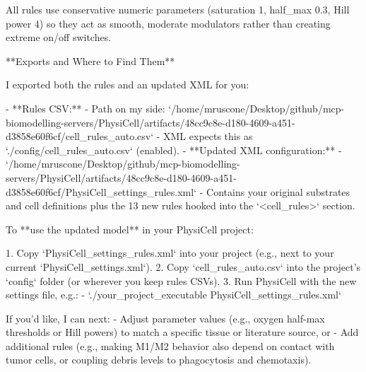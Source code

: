 \documentclass[11pt,a4paper]{article}
\begin{document}
\begin{copilotbox}
All rules use conservative numeric parameters (saturation 1, half\_max 0.3, Hill power 4) so they act as smooth, moderate modulators rather than creating extreme on/off switches.

**Exports and Where to Find Them**

I exported both the rules and an updated XML for you:

- **Rules CSV:**  
  - Path on my side:  
    `/home/mruscone/Desktop/github/mcp-biomodelling-servers/PhysiCell/artifacts/48cc9c8e-d180-4609-a451-d3858e60f6cf/cell\_rules\_auto.csv`  
  - XML expects this as `./config/cell\_rules\_auto.csv` (enabled).
- **Updated XML configuration:**  
  - `/home/mruscone/Desktop/github/mcp-biomodelling-servers/PhysiCell/artifacts/48cc9c8e-d180-4609-a451-d3858e60f6cf/PhysiCell\_settings\_rules.xml`  
  - Contains your original substrates and cell definitions plus the 13 new rules hooked into the `<cell\_rules>` section.

To **use the updated model** in your PhysiCell project:

1. Copy `PhysiCell\_settings\_rules.xml` into your project (e.g., next to your current `PhysiCell\_settings.xml`).
2. Copy `cell\_rules\_auto.csv` into the project’s `config` folder (or wherever you keep rules CSVs).
3. Run PhysiCell with the new settings file, e.g.:
   - `./your\_project\_executable PhysiCell\_settings\_rules.xml`

If you’d like, I can next:
- Adjust parameter values (e.g., oxygen half-max thresholds or Hill powers) to match a specific tissue or literature source, or
- Add additional rules (e.g., making M1/M2 behavior also depend on contact with tumor cells, or coupling debris levels to phagocytosis and chemotaxis).

\end{copilotbox}
\end{document}

